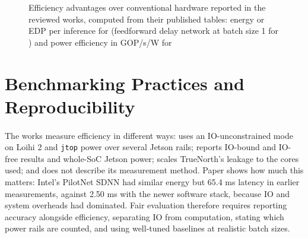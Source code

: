 \documentclass[12pt,a4paper,final]{extreport}
\begin{document}
\begin{figure}[htbp]
\centering
{}
\caption{Efficiency advantages over conventional hardware reported in the reviewed works, computed from their published tables: energy or EDP per inference for \cite{p1,p3,p4} (feedforward delay network at batch size 1 for \cite{p1}) and power efficiency in GOP/s/W for \cite{p2}}
\label{fig:cmp_gains}
\end{figure}

\section{Benchmarking Practices and Reproducibility}

\paragraph{} The works measure efficiency in different ways: \cite{p1} uses an IO-unconstrained mode on Loihi 2 and \texttt{jtop} power over several Jetson rails; \cite{p4} reports IO-bound and IO-free results and whole-SoC Jetson power; \cite{p3} scales TrueNorth's leakage to the cores used; and \cite{p2} does not describe its measurement method. Paper \cite{p4} shows how much this matters: Intel's PilotNet SDNN had similar energy but 65.4 ms latency in earlier measurements, against 2.50 ms with the newer software stack, because IO and system overheads had dominated. Fair evaluation therefore requires reporting accuracy alongside efficiency, separating IO from computation, stating which power rails are counted, and using well-tuned baselines at realistic batch sizes.
\end{document}
